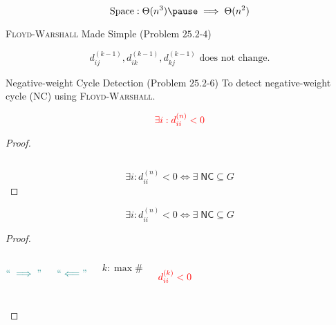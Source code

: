 \begin{frame}{}
  

  \pause
  \[
    \text{Space}: \Theta(n^3) \pause \implies \Theta(n^2)
  \]
\end{frame}

\begin{frame}{}
  \begin{exampleblock}{\textsc{Floyd-Warshall} Made Simple (Problem $25.2$-$4$)}
    
  \end{exampleblock}

  \pause
  \vspace{0.60cm}
  \[
    d_{ij}^{(k-1)}, d_{ik}^{(k-1)}, d_{kj}^{(k-1)} \text{ does not change.}
  \]
\end{frame}

\begin{frame}{}
  \begin{exampleblock}{Negative-weight Cycle Detection (Problem $25.2$-$6$)}
    To detect negative-weight cycle (\textsf{NC}) using \textsc{Floyd-Warshall}.
  \end{exampleblock}

  \pause
  \[
    \textcolor{red}{\exists i: d_{ii}^{(n)} < 0}
  \]

  \pause
  \begin{proof}
    \begin{columns}
	\pause
	\pause
    \end{columns}

    \pause
    \vspace{0.50cm}
    \[
      \exists i: d_{ii}^{(n)} < 0 \iff \exists\; \textsf{NC} \subseteq G
    \]
  \end{proof}
\end{frame}

\begin{frame}{}
  \[
    \exists i: d_{ii}^{(n)} < 0 \iff \exists\; \textsf{NC} \subseteq G
  \]

  \begin{proof}
    \begin{columns}
        \pause
	\[
	  \textcolor{teal}{``\implies"}
	\]

	\pause
	{\vspace{-0.30cm}\centerline{}}
        \pause
	\[
	  \textcolor{teal}{``\Longleftarrow"}
	\]

	\pause
	{\vspace{-0.30cm}\centerline{}}
	\[
	  k: \max \#
	\]

	\pause
	\[
	  \textcolor{red}{d_{ii}^{(k)} < 0}
	\]
    \end{columns}
  \end{proof}
\end{frame}

